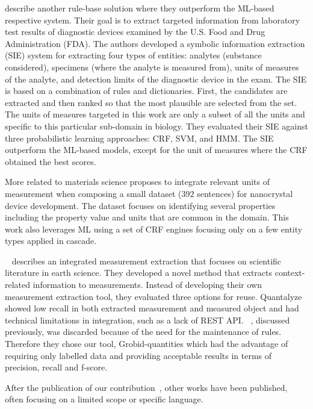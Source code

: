 \cite{kang_extracting_2013} describe another rule-base solution where they outperform the ML-based respective system. 
Their goal is to extract targeted information from laboratory test results of diagnostic devices examined by  the U.S. Food and Drug Administration (FDA). 
The authors developed a symbolic information extraction (SIE) system for extracting four types of entities: analytes (substance considered), specimens (where the analyte is measured from), units of measures of the analyte, and detection limits of the diagnostic device in the exam.
The SIE is based on a combination of rules and dictionaries. First, the candidates are extracted and then ranked so that the most plausible are selected from the set. The units of measures targeted in this work are only a subset of all the units and specific to this particular sub-domain in biology. 
They evaluated their SIE against three probabilistic learning approaches: CRF, SVM, and HMM. The SIE outperform the ML-based models, except for the unit of measures where the CRF obtained the best scores. 

More related to materials science \cite{dieb2015framework} proposes to integrate relevant units of measurement when composing a small dataset (392 sentences) for nanocrystal device development. 
The dataset focuses on identifying several properties including the property value and units that are common in the domain. 
This work also leverages ML using a set of CRF engines focusing only on a few entity types applied in cascade. 

~\cite{hundman2017measurement} describes an integrated measurement extraction that focuses on scientific literature in earth science. 
They developed a novel method that extracts context-related information to measurements. Instead of developing their own measurement extraction tool, they evaluated three options for reuse. Quantalyze showed low recall in both extracted measurement and measured object and had technical limitations in integration, such as a lack of REST API. ~\cite{agatonovic2008large}, discussed previously, was discarded because of the need for the maintenance of rules. 
Therefore they chose our tool, Grobid-quantities which had the advantage of requiring only labelled data and providing acceptable results in terms of precision, recall and f-score. 

After the publication of our contribution~\cite{foppiano2019quantities}, other works have been published, often focusing on a limited scope or specific language. 

